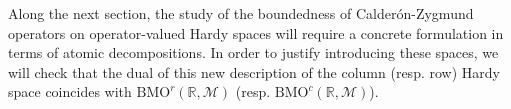 \documentclass[psamsfonts]{amsart}
\newtheorem{remark}[theorem]{Remark}
\newcommand{\Linfty}{L_\infty}
\newcommand{\Ltwo}{L_2}
\newcommand{\Ltwoc}{L_2^c}
\newcommand{\Ltwor}{L_2^r}
\newcommand{\BMOc}{\mathrm{BMO}^c}
\newcommand{\BMOr}{\mathrm{BMO}^r}
\newcommand{\Tw}{\widetilde{T}_\omega}
\begin{document}
% 
    Along the next section, the study of the boundedness of Calder\'on-Zygmund operators on operator-valued Hardy spaces will require a concrete formulation in terms of atomic decompositions. In order to justify introducing these spaces, we will check that the dual of this new description of the column (resp. row) Hardy space coincides with $\BMOr(\mathbb{R},\mathcal{M})$ (resp. $\BMOc(\mathbb{R},\mathcal{M})$).
\end{document}
